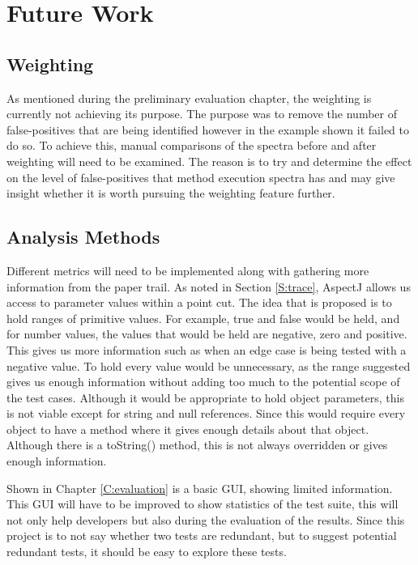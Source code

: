 \chapter{Future Work}\label{C:future}

\section{Weighting}
As mentioned during the preliminary evaluation chapter, the weighting is currently not achieving its purpose. The purpose was to remove the number of false-positives that are being identified however in the example shown it failed to do so. To achieve this, manual comparisons of the spectra before and after weighting will need to be examined. The reason is to try and determine the effect on the level of false-positives that method execution spectra has and may give insight whether it is worth pursuing the weighting feature further.

\section{Analysis Methods}
Different metrics will need to be implemented along with gathering more information from the paper trail. As noted in Section \ref{S:trace}, AspectJ allows us access to parameter values within a point cut. The idea that is proposed is to hold ranges of primitive values. For example, true and false would be held, and for number values, the values that would be held are negative, zero and positive. This gives us more information such as when an edge case is being tested with a negative value. To hold every value would be unnecessary, as the range suggested gives us enough information without adding too much to the potential scope of the test cases. Although it would be appropriate to hold object parameters, this is not viable except for string and null references. Since this would require every object to have a method where it gives enough details about that object. Although there is a toString() method, this is not always overridden or gives enough information.

Shown in Chapter \ref{C:evaluation} is a basic GUI, showing limited information. This GUI will have to be improved to show statistics of the test suite, this will not only help developers but also during the evaluation of the results. Since this project is to not say whether two tests are redundant, but to suggest potential redundant tests, it should be easy to explore these tests.

